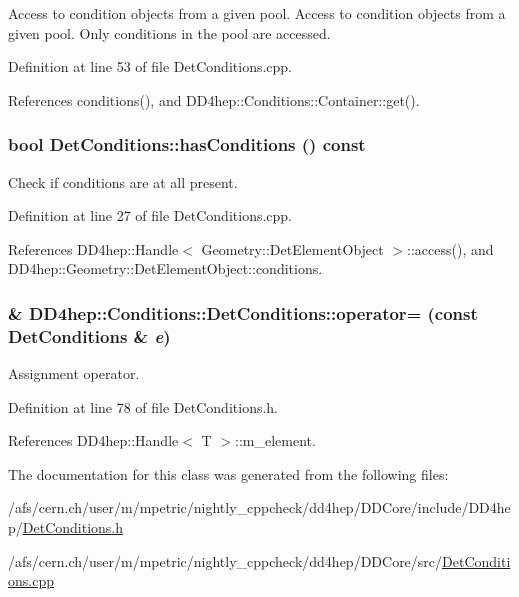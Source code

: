 Access to condition objects from a given pool. Access to condition objects from a given pool. Only conditions in the pool are accessed. 

Definition at line 53 of file DetConditions.cpp.

References conditions(), and DD4hep::Conditions::Container::get().\hypertarget{class_d_d4hep_1_1_conditions_1_1_det_conditions_a1e7e83b427b3e91aac8218f6cea503ed}{
\subsubsection[{hasConditions}]{\setlength{\rightskip}{0pt plus 5cm}bool DetConditions::hasConditions () const}}
\label{class_d_d4hep_1_1_conditions_1_1_det_conditions_a1e7e83b427b3e91aac8218f6cea503ed}


Check if conditions are at all present. 

Definition at line 27 of file DetConditions.cpp.

References DD4hep::Handle$<$ Geometry::DetElementObject $>$::access(), and DD4hep::Geometry::DetElementObject::conditions.\hypertarget{class_d_d4hep_1_1_conditions_1_1_det_conditions_aea710da17ca864a0528a7b3503c16d2d}{
\subsubsection[{operator=}]{\& DD4hep::Conditions::DetConditions::operator= (const {\bf DetConditions} \& {\em e})}}
\label{class_d_d4hep_1_1_conditions_1_1_det_conditions_aea710da17ca864a0528a7b3503c16d2d}


Assignment operator. 

Definition at line 78 of file DetConditions.h.

References DD4hep::Handle$<$ T $>$::m\_\-element.

The documentation for this class was generated from the following files:\begin{DoxyCompactItemize}
\item 
/afs/cern.ch/user/m/mpetric/nightly\_\-cppcheck/dd4hep/DDCore/include/DD4hep/\hyperlink{_det_conditions_8h}{DetConditions.h}\item 
/afs/cern.ch/user/m/mpetric/nightly\_\-cppcheck/dd4hep/DDCore/src/\hyperlink{_det_conditions_8cpp}{DetConditions.cpp}\end{DoxyCompactItemize}
